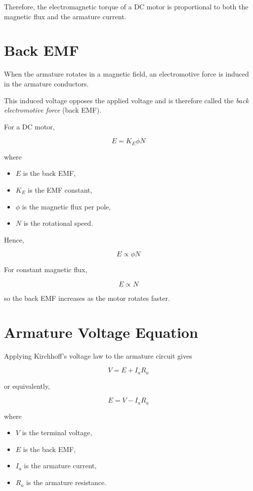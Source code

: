 \documentclass[11pt,a4paper]{article}
\begin{document}
Therefore, the electromagnetic torque of a DC motor is proportional to
both the magnetic flux and the armature current.

\section{Back EMF}

When the armature rotates in a magnetic field, an electromotive force
is induced in the armature conductors.

This induced voltage opposes the applied voltage and is therefore
called the \emph{back electromotive force} (back EMF).

For a DC motor,

\[
\boxed{
E = K_E \phi N
}
\]

where

\begin{itemize}
    \item $E$ is the back EMF,
    \item $K_E$ is the EMF constant,
    \item $\phi$ is the magnetic flux per pole,
    \item $N$ is the rotational speed.
\end{itemize}

Hence,

\[
\boxed{
E \propto \phi N
}
\]

For constant magnetic flux,

\[
\boxed{
E \propto N
}
\]

so the back EMF increases as the motor rotates faster.

\section{Armature Voltage Equation}

Applying Kirchhoff's voltage law to the armature circuit gives

\[
\boxed{
V = E + I_a R_a
}
\]

or equivalently,

\[
\boxed{
E = V - I_a R_a
}
\]

where

\begin{itemize}
    \item $V$ is the terminal voltage,
    \item $E$ is the back EMF,
    \item $I_a$ is the armature current,
    \item $R_a$ is the armature resistance.
\end{itemize}
\end{document}
